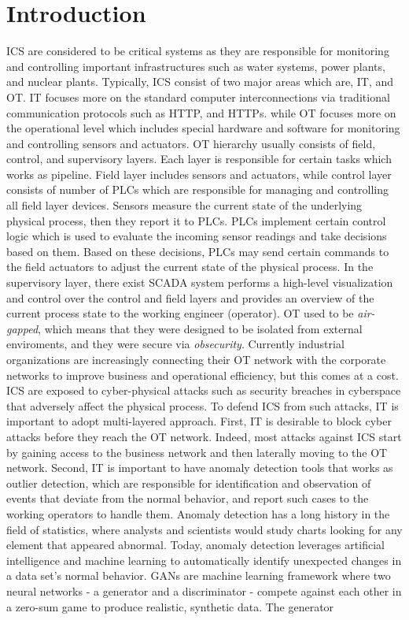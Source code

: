 \chapter{Introduction}
\label{chap:introduction}

\ac{ICS} are considered to be critical systems as they are responsible for monitoring and controlling important infrastructures such as water systems, power plants, and nuclear plants. Typically, \ac{ICS} consist of two major areas which are, \ac{IT}, and \ac{OT}. \ac{IT} focuses more on the standard computer interconnections via traditional communication protocols such as \ac{HTTP}, and \ac{HTTPs}. while \ac{OT} focuses more on the operational level which includes special hardware and software for monitoring and controlling sensors and actuators. \ac{OT} hierarchy usually consists of field, control, and supervisory layers. Each layer is responsible for certain tasks which works as pipeline. Field layer includes sensors and actuators, while control layer consists of number of \ac{PLCs} which are responsible for managing and controlling all field layer devices. Sensors measure the current state of the underlying physical process, then they report it to \ac{PLCs}. \ac{PLCs} implement certain control logic which is used to evaluate the incoming sensor readings and take decisions based on them. Based on these decisions, \ac{PLCs} may send certain commands to the field actuators to adjust the current state of the physical process. In the supervisory layer, there exist \ac{SCADA} system performs a high-level visualization and control over the control and field layers and provides an overview of the current process state to the working engineer (operator). \ac{OT} used to be \textit{air-gapped}, which means that they were designed to be isolated from external enviroments, and they were secure via \textit{obsecurity}. Currently industrial organizations are increasingly connecting their \ac{OT} network with the corporate networks to improve business and operational efficiency, but this comes at a cost. \ac{ICS} are exposed to cyber-physical attacks such as security breaches in cyberspace that adversely affect the physical process. To defend \ac{ICS} from such attacks, \ac{IT} is important to adopt multi-layered approach. First, \ac{IT} is desirable to block cyber attacks before they reach the \ac{OT} network. Indeed, most attacks against \ac{ICS} start by gaining access to the business network and then laterally moving to the \ac{OT} network. Second, \ac{IT} is important to have anomaly detection tools that works as outlier detection, which are responsible for identification and observation of events that deviate from the normal behavior, and report such cases to the working operators to handle them. Anomaly detection has a long history in the field of statistics, where analysts and scientists would study charts looking for any element that appeared abnormal. Today, anomaly detection leverages artificial intelligence and machine learning to automatically identify unexpected changes in a data set's normal behavior. \ac{GANs} are machine learning framework where two neural networks - a generator and a discriminator - compete against each other in a zero-sum game to produce realistic, synthetic data. The generator 